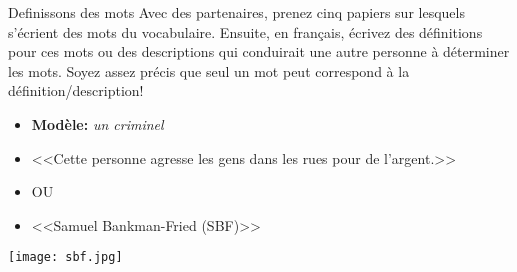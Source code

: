 \begin{frame}{Definissons des mots}
  Avec des partenaires, prenez cinq papiers sur lesquels s'écrient des mots du vocabulaire.
  Ensuite, \alert{en français}, écrivez des définitions pour ces mots ou des descriptions qui conduirait une autre personne à déterminer les mots.
  Soyez assez précis que seul un mot peut correspond à la définition/description!
  \begin{itemize}
    \item[] \textbf{Modèle:} \emph{un criminel}
    \item {}<<Cette personne agresse les gens dans les rues pour de l'argent.>>
    \item[] OU
    \item {}<<Samuel Bankman-Fried (SBF)>>
  \end{itemize}
  \begin{flushright}
    \texttt{[image: sbf.jpg]}
  \end{flushright}
\end{frame}